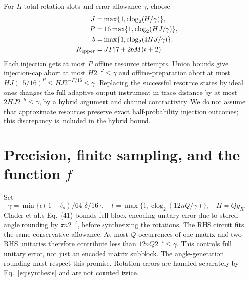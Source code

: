 \documentclass[11pt]{article}
\newcommand{\clog}{\operatorname{clog}_2}
\begin{document}
For $H$ total rotation slots and error allowance $\gamma$, choose
\begin{equation}\label{eq:synthesis}
\begin{aligned}
 J&=\max\{1,\clog(H/\gamma)\},\\
 P&=16\max\{1,\clog(HJ/\gamma)\},\\
 b&=\max\{1,\clog(4HJ/\gamma)\},\\
 R_{\rm upper}&=JP[7+2bM(b+2)].
\end{aligned}
\end{equation}
Each injection gets at most $P$ offline resource attempts. Union bounds give injection-cap abort at most $H2^{-J}\le\gamma$ and offline-preparation abort at most
$HJ(15/16)^P\le HJ2^{-P/16}\le\gamma$. Replacing the successful resource states by ideal ones changes the full adaptive output instrument in trace distance by at most $2HJ2^{-b}\le\gamma$, by a hybrid argument and channel contractivity. We do not assume that approximate resources preserve exact half-probability injection outcomes; this discrepancy is included in the hybrid bound.

\section{Precision, finite sampling, and the function \texorpdfstring{$f$}{f}}
Set
\begin{equation}\label{eq:precision}
 \gamma=\min\{\epsilon(1-\delta_s)/64,\delta/16\},\quad
 t=\max\{1,\clog(12nQ/\gamma)\},\quad H=Qg_R.
\end{equation}
Clader et al.'s Eq.~(41) bounds full block-encoding unitary error due to stored angle rounding by $\pi n2^{-t}$, before synthesizing the rotations. The RHS circuit fits the same conservative allowance. At most $Q$ occurrences of one matrix and two RHS unitaries therefore contribute less than $12nQ2^{-t}\le\gamma$. This controls full unitary error, not just an encoded matrix subblock. The angle-generation rounding must respect this promise. Rotation errors are handled separately by Eq.~\eqref{eq:synthesis} and are not counted twice.
\end{document}
